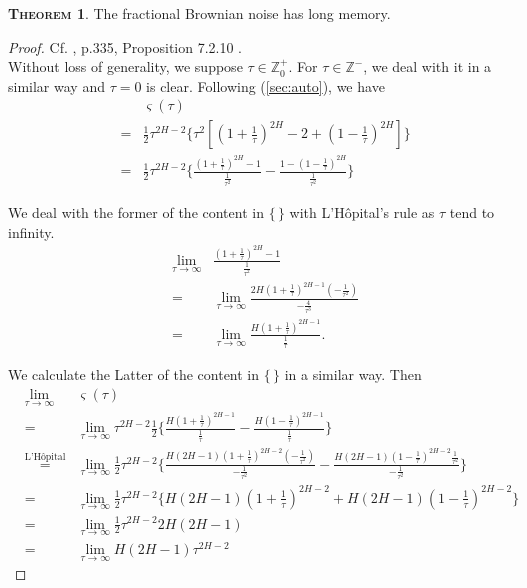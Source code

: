 \documentclass[a4paper, twoside, 11pt]{article}
\theoremstyle{definition}
\newtheorem{theorem}[definition]{\scshape Theorem}
\begin{document}
\begin{theorem}
  The fractional Brownian noise has long memory.
  \label{sec:lmemory}
\end{theorem}
\begin{proof}
  Cf. \cite{nourdin}, p.335, Proposition 7.2.10 .\\
  Without loss of generality, we suppose $\tau \in \mathbb{Z}^+_0$. For $\tau\in\mathbb{Z}^-$, we deal with it in a similar way and $\tau=0$ is clear. Following (\ref{sec:auto}), we have
  \begin{eqnarray*}
  &&\varsigma(\tau) \\
  &=& \frac{1}{2} \tau^{2H-2}\{ \tau^2[(1+\frac{1}{\tau})^{2H} - 2 + (1-\frac{1}{\tau})^{2H}] \} \\
  &=& \frac{1}{2} \tau^{2H-2}\{ \frac{(1+\frac{1}{\tau})^{2H} - 1 } {\frac{1}{\tau^2}} -  \frac{1 - (1-\frac{1}{\tau})^{2H}} {\frac{1}{\tau^2}} \}
\end{eqnarray*}

We deal with the former of the content in $\{\,\}$ with L'H\^opital's rule as $\tau$ tend to infinity.
\begin{eqnarray*}
&\lim\limits_{\tau\rightarrow\infty}&\frac{(1+\frac{1}{\tau})^{2H} - 1 } {\frac{1}{\tau^2}}\\
&=& \lim\limits_{\tau\rightarrow\infty} \frac{2H(1+\frac{1}{\tau})^{2H-1}(-\frac{1}{\tau^2})}{-\frac{4}{\tau^3}} \\
&=&   \lim\limits_{\tau\rightarrow\infty}\frac{H(1+\frac{1}{\tau})^{2H-1}}{\frac{1}{\tau}}.
\end{eqnarray*}

We calculate the Latter of the content in $\{\,\}$ in a similar way. Then
\begin{eqnarray*}
&\lim\limits_{\tau\rightarrow\infty}&\varsigma(\tau)\\
&=&\lim\limits_{\tau\rightarrow\infty} \tau^{2H-2} \frac{1}{2}\{ \frac{H(1 +\frac{1}{\tau})^{2H-1}}{\frac{1}{\tau}} - \frac{H(1-\frac{1}{\tau})^{2H-1}}{\frac{1}{\tau}}\}\\
&\overset{\text{L'H\^opital}}{=}&\lim\limits_{\tau\rightarrow\infty}  \frac{1}{2} \tau^{2H-2}\{\frac{H(2H-1)(1+\frac{1}{\tau})^{2H-2}(-\frac{1}{\tau^2})}{-\frac{1}{\tau^2}} - \frac{H(2H-1)(1-\frac{1}{\tau})^{2H-2}\frac{1}{\tau^2}}{-\frac{1}{\tau^2}}\}\\
&=& \lim\limits_{\tau\rightarrow\infty} \frac{1}{2} \tau^{2H-2}\{H(2H-1)(1+\frac{1}{\tau})^{2H-2} + H(2H-1)(1-\frac{1}{\tau})^{2H-2}\}\\
&=& \lim\limits_{\tau\rightarrow\infty}\frac{1}{2} \tau^{2H-2} 2H(2H-1)\\
&=& \lim\limits_{\tau\rightarrow\infty} H(2H-1) \tau^{2H-2}
\end{eqnarray*}



\end{proof}
\end{document}
